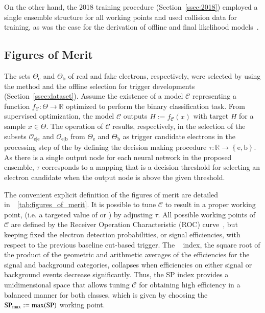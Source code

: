 On the other hand, the 2018 training procedure (Section~\ref{ssec:2018})
employed a single ensemble structure for all working points and used
collision data for training, as was the case for the derivation of offline
and final \hlt likelihood models~\cite{aaboud2019electron}.





\subsection{Figures of Merit}\label{ssec:fom}



The sets $\Theta_{\text{e}}$ and $\Theta_{\text{b}}$ of real and fake electrons, respectively, were selected by using the \tnp{} method and the offline selection for trigger developments (Section~\ref{ssec:dataset}). Assume the existence of a model $\mathcal{C}$ representing a function $f_{\mathcal{C}} : \Theta \rightarrow \mathbb{R}$ optimized to perform the binary classification task.   From supervised optimization, the model $\mathcal{C}$ outputs $\hat{H}:=f_{\mathcal{C}}(x)$ with target $H$ for a sample $x \in \Theta$. The operation of $\mathcal{C}$ results, respectively, in the selection of the subsets $\mathcal{O}_{\text{e}|\text{e}}$ and $\mathcal{O}_{\text{e}|\text{b}}$ from $\Theta_{\text{e}}$ and $\Theta_{\text{b}}$ as trigger candidate electrons in the \fastcalo{} processing step of the \hlt{} by defining the decision making procedure $\tau : \mathbb{R} \rightarrow \left\{\text{e},\text{b}\right\}$. As there is a single output node for each neural network in the proposed \rnn{} ensemble, $\tau$ corresponds to a mapping that is a decision threshold for selecting an electron candidate when the output node is above the given threshold.  



The convenient explicit definition of the figures of merit are detailed in~\tablename~\ref{tab:figures_of_merit}.
It is possible to tune $\mathcal{C}$ to result in a proper working point, (i.e. a targeted value of \pd{} or \pf{}) by adjusting $\tau$. All possible working points of $\mathcal{C}$ are defined by the Receiver Operation Characteristic (ROC) curve~\cite{van_trees_part1}, but keeping fixed the electron detection probabilities, or signal efficiencies, with respect to the previous baseline cut-based trigger. The \spindex{}~\cite{dos2006neural} index, the square root of the product of the geometric and arithmetic averages of the efficiencies for the signal and background categories, collapses when efficiencies on either signal or background events decrease significantly. Thus, the SP index provides a unidimensional space that allows tuning $\mathcal{C}$ for obtaining high efficiency in a balanced manner for both classes, which is given by choosing the $\text{SP}_{\text{max}}{}:=\max(\text{SP}{})$ working point.




